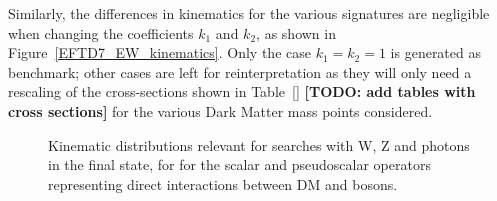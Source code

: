Similarly, the differences in kinematics for the various signatures
are negligible when changing the coefficients $k_1$ and $k_2$, as shown
in Figure~\ref{EFTD7_EW_kinematics}. Only the case $k_1=k_2=1$ is generated as benchmark;
other cases are left for reinterpretation as they will only need a rescaling of the cross-sections
shown in Table~\ref{} \textbf{[TODO: add tables with cross sections]} for the various Dark Matter
mass points considered.

\begin{figure}[h!]
  \centering
    \hfill
    \caption{Kinematic distributions relevant for searches with W, Z and photons in the final state,
    for for the scalar and pseudoscalar operators representing direct interactions between DM and bosons.}
    \label{fig:EFTD7_EW_kinematics}

\end{figure}

